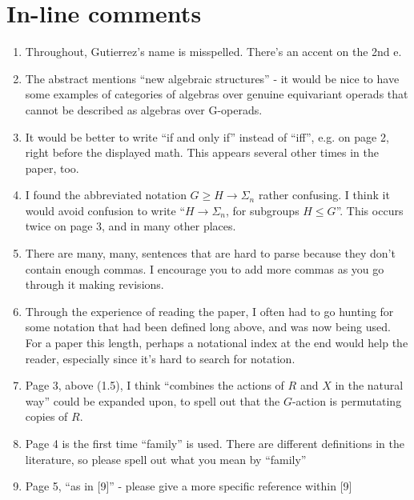 \documentclass{article}
\begin{document}
\section{In-line comments}

\begin{enumerate}

\item
Throughout, Gutierrez's name is misspelled. There's an accent on the 2nd e.

\item
The abstract mentions ``new algebraic structures'' - it would be nice to have some examples of categories of algebras over genuine equivariant operads that cannot be described as algebras over G-operads.

\item
It would be better to write ``if and only if'' instead of ``iff'', e.g. on page 2, right before the displayed math. This appears several other times in the paper, too.

\item
I found the abbreviated notation $G \geq H \to \Sigma_n$ rather confusing. I think it would avoid confusion to write ``$H\to \Sigma_n$, for subgroups $H \leq G$''. This occurs twice on page 3, and in many other places.

\item
There are many, many, sentences that are hard to parse because they don't contain enough commas. I encourage you to add more commas as you go through it making revisions.

\item
Through the experience of reading the paper, I often had to go hunting for some notation that had been defined long above, and was now being used. For a paper this length, perhaps a notational index at the end would help the reader, especially since it's hard to search for notation.

\item
Page 3, above (1.5), I think ``combines the actions of $R$ and $X$ in the natural way'' could be expanded upon, to spell out that the $G$-action is permutating copies of $R$.

\item
Page 4 is the first time ``family'' is used. There are different definitions in the literature, so please spell out what you mean by ``family''

\item
Page 5, ``as in [9]'' - please give a more specific reference within [9]


\end{enumerate}
\end{document}

